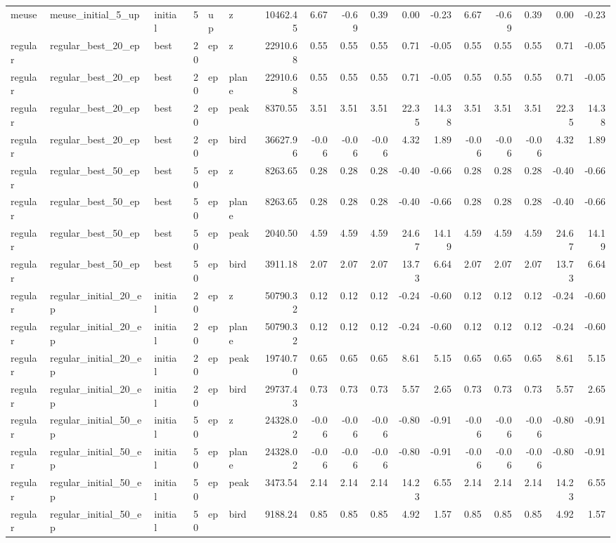\begin{tabular}{lllrllrrrrrrrrrrr}
meuse & meuse_initial_5_up & initial & 5 & up & z & 10462.45 & 6.67 & -0.69 & 0.39 & 0.00 & -0.23 & 6.67 & -0.69 & 0.39 & 0.00 & -0.23 \\
regular & regular_best_20_ep & best & 20 & ep & z & 22910.68 & 0.55 & 0.55 & 0.55 & 0.71 & -0.05 & 0.55 & 0.55 & 0.55 & 0.71 & -0.05 \\
regular & regular_best_20_ep & best & 20 & ep & plane & 22910.68 & 0.55 & 0.55 & 0.55 & 0.71 & -0.05 & 0.55 & 0.55 & 0.55 & 0.71 & -0.05 \\
regular & regular_best_20_ep & best & 20 & ep & peak & 8370.55 & 3.51 & 3.51 & 3.51 & 22.35 & 14.38 & 3.51 & 3.51 & 3.51 & 22.35 & 14.38 \\
regular & regular_best_20_ep & best & 20 & ep & bird & 36627.96 & -0.06 & -0.06 & -0.06 & 4.32 & 1.89 & -0.06 & -0.06 & -0.06 & 4.32 & 1.89 \\
regular & regular_best_50_ep & best & 50 & ep & z & 8263.65 & 0.28 & 0.28 & 0.28 & -0.40 & -0.66 & 0.28 & 0.28 & 0.28 & -0.40 & -0.66 \\
regular & regular_best_50_ep & best & 50 & ep & plane & 8263.65 & 0.28 & 0.28 & 0.28 & -0.40 & -0.66 & 0.28 & 0.28 & 0.28 & -0.40 & -0.66 \\
regular & regular_best_50_ep & best & 50 & ep & peak & 2040.50 & 4.59 & 4.59 & 4.59 & 24.67 & 14.19 & 4.59 & 4.59 & 4.59 & 24.67 & 14.19 \\
regular & regular_best_50_ep & best & 50 & ep & bird & 3911.18 & 2.07 & 2.07 & 2.07 & 13.73 & 6.64 & 2.07 & 2.07 & 2.07 & 13.73 & 6.64 \\
regular & regular_initial_20_ep & initial & 20 & ep & z & 50790.32 & 0.12 & 0.12 & 0.12 & -0.24 & -0.60 & 0.12 & 0.12 & 0.12 & -0.24 & -0.60 \\
regular & regular_initial_20_ep & initial & 20 & ep & plane & 50790.32 & 0.12 & 0.12 & 0.12 & -0.24 & -0.60 & 0.12 & 0.12 & 0.12 & -0.24 & -0.60 \\
regular & regular_initial_20_ep & initial & 20 & ep & peak & 19740.70 & 0.65 & 0.65 & 0.65 & 8.61 & 5.15 & 0.65 & 0.65 & 0.65 & 8.61 & 5.15 \\
regular & regular_initial_20_ep & initial & 20 & ep & bird & 29737.43 & 0.73 & 0.73 & 0.73 & 5.57 & 2.65 & 0.73 & 0.73 & 0.73 & 5.57 & 2.65 \\
regular & regular_initial_50_ep & initial & 50 & ep & z & 24328.02 & -0.06 & -0.06 & -0.06 & -0.80 & -0.91 & -0.06 & -0.06 & -0.06 & -0.80 & -0.91 \\
regular & regular_initial_50_ep & initial & 50 & ep & plane & 24328.02 & -0.06 & -0.06 & -0.06 & -0.80 & -0.91 & -0.06 & -0.06 & -0.06 & -0.80 & -0.91 \\
regular & regular_initial_50_ep & initial & 50 & ep & peak & 3473.54 & 2.14 & 2.14 & 2.14 & 14.23 & 6.55 & 2.14 & 2.14 & 2.14 & 14.23 & 6.55 \\
regular & regular_initial_50_ep & initial & 50 & ep & bird & 9188.24 & 0.85 & 0.85 & 0.85 & 4.92 & 1.57 & 0.85 & 0.85 & 0.85 & 4.92 & 1.57 \\
\bottomrule
\end{tabular}
